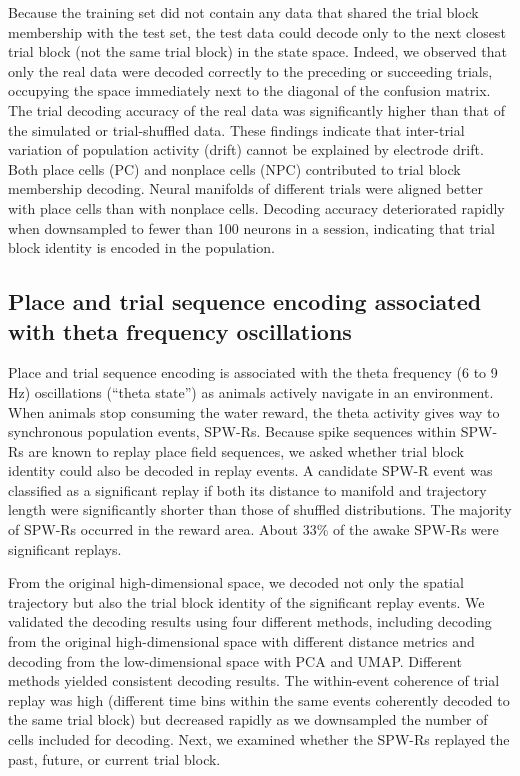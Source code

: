 Because the training set did not contain any data that shared the trial block membership with the test set, the test data could decode only to the next closest trial block (not the same trial block) in the state space. Indeed, we observed that only the real data were decoded correctly to the preceding or succeeding trials, occupying the space immediately next to the diagonal of the confusion matrix. The trial decoding accuracy of the real data was significantly higher than that of the simulated or trial-shuffled data. These findings indicate that inter-trial variation of population activity (drift) cannot be explained by electrode drift. Both place cells (PC) and nonplace cells (NPC) contributed to trial block membership decoding. Neural manifolds of different trials were aligned better with place cells than with nonplace cells. Decoding accuracy deteriorated rapidly when downsampled to fewer than 100 neurons in a session, indicating that trial block identity is encoded in the population.

\subsection{Place and trial sequence encoding associated with theta frequency oscillations}

Place and trial sequence encoding is associated with the theta frequency (6 to 9 Hz) oscillations (``theta state'') as animals actively navigate in an environment. When animals stop consuming the water reward, the theta activity gives way to synchronous population events, SPW-Rs. Because spike sequences within SPW-Rs are known to replay place field sequences, we asked whether trial block identity could also be decoded in replay events. A candidate SPW-R event was classified as a significant replay if both its distance to manifold and trajectory length were significantly shorter than those of shuffled distributions. The majority of SPW-Rs occurred in the reward area. About 33\% of the awake SPW-Rs were significant replays.

From the original high-dimensional space, we decoded not only the spatial trajectory but also the trial block identity of the significant replay events. We validated the decoding results using four different methods, including decoding from the original high-dimensional space with different distance metrics and decoding from the low-dimensional space with PCA and UMAP. Different methods yielded consistent decoding results. The within-event coherence of trial replay was high (different time bins within the same events coherently decoded to the same trial block) but decreased rapidly as we downsampled the number of cells included for decoding. Next, we examined whether the SPW-Rs replayed the past, future, or current trial block.

